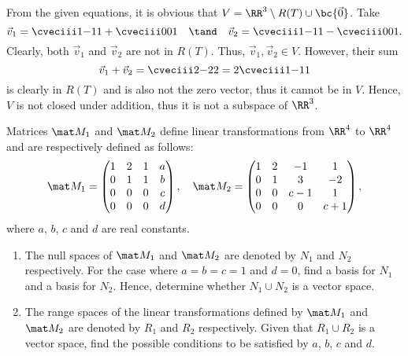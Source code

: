\begin{solution}
\begin{ppart}
    \end{ppart}
    \begin{ppart}
        From the given equations, it is obvious that $V = \RR^3 \setminus R(T) \cup \bc{\vec 0}$. Take \[\vec v_1 = \cveciii1{-1}{1} + \cveciii001 \quad \tand \quad \vec v_2 = \cveciii1{-1}{1} - \cveciii001.\] Clearly, both $\vec v_1$ and $\vec v_2$ are not in $R(T)$. Thus, $\vec v_1, \vec v_2 \in V$. However, their sum \[\vec v_1 + \vec v_2 = \cveciii2{-2}{2} = 2\cveciii1{-1}{1}\] is clearly in $R(T)$ and is also not the zero vector, thus it cannot be in $V$. Hence, $V$ is not closed under addition, thus it is not a subspace of $\RR^3$.
    \end{ppart}
\end{solution}

\begin{problem}
    Matrices $\mat M_1$ and $\mat M_2$ define linear transformations from $\RR^4$ to $\RR^4$ and are respectively defined as follows: \[\mat M_1 = \begin{pmatrix}1 & 2 & 1 & a \\ 0 & 1 & 1 & b \\ 0 & 0 & 0 & c \\ 0 & 0 & 0 & d\end{pmatrix}, \quad \mat M_2 = \begin{pmatrix} 1 & 2 & -1 & 1 \\ 0 & 1 & 3 & -2 \\ 0 & 0 & c-1 & 1 \\ 0 & 0 & 0 & c+1 \end{pmatrix},\] where $a$, $b$, $c$ and $d$ are real constants.

    \begin{enumerate}
        \item The null spaces of $\mat M_1$ and $\mat M_2$ are denoted by $N_1$ and $N_2$ respectively. For the case where $a = b = c = 1$ and $d = 0$, find a basis for $N_1$ and a basis for $N_2$. Hence, determine whether $N_1 \cup N_2$ is a vector space.
        \item The range spaces of the linear transformations defined by $\mat M_1$ and $\mat M_2$ are denoted by $R_1$ and $R_2$ respectively. Given that $R_1 \cup R_2$ is a vector space, find the possible conditions to be satisfied by $a$, $b$, $c$ and $d$.
    \end{enumerate}
\end{problem}
